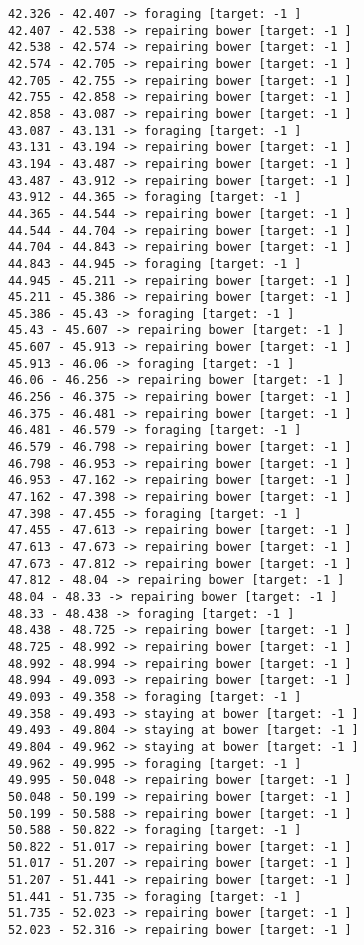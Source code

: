 \documentclass[11pt]{article}
\begin{document}
\begin{Verbatim}[commandchars=\\\{\}]
42.326 - 42.407 -> foraging [target: -1 ]
42.407 - 42.538 -> repairing bower [target: -1 ]
42.538 - 42.574 -> repairing bower [target: -1 ]
42.574 - 42.705 -> repairing bower [target: -1 ]
42.705 - 42.755 -> repairing bower [target: -1 ]
42.755 - 42.858 -> repairing bower [target: -1 ]
42.858 - 43.087 -> repairing bower [target: -1 ]
43.087 - 43.131 -> foraging [target: -1 ]
43.131 - 43.194 -> repairing bower [target: -1 ]
43.194 - 43.487 -> repairing bower [target: -1 ]
43.487 - 43.912 -> repairing bower [target: -1 ]
43.912 - 44.365 -> foraging [target: -1 ]
44.365 - 44.544 -> repairing bower [target: -1 ]
44.544 - 44.704 -> repairing bower [target: -1 ]
44.704 - 44.843 -> repairing bower [target: -1 ]
44.843 - 44.945 -> foraging [target: -1 ]
44.945 - 45.211 -> repairing bower [target: -1 ]
45.211 - 45.386 -> repairing bower [target: -1 ]
45.386 - 45.43 -> foraging [target: -1 ]
45.43 - 45.607 -> repairing bower [target: -1 ]
45.607 - 45.913 -> repairing bower [target: -1 ]
45.913 - 46.06 -> foraging [target: -1 ]
46.06 - 46.256 -> repairing bower [target: -1 ]
46.256 - 46.375 -> repairing bower [target: -1 ]
46.375 - 46.481 -> repairing bower [target: -1 ]
46.481 - 46.579 -> foraging [target: -1 ]
46.579 - 46.798 -> repairing bower [target: -1 ]
46.798 - 46.953 -> repairing bower [target: -1 ]
46.953 - 47.162 -> repairing bower [target: -1 ]
47.162 - 47.398 -> repairing bower [target: -1 ]
47.398 - 47.455 -> foraging [target: -1 ]
47.455 - 47.613 -> repairing bower [target: -1 ]
47.613 - 47.673 -> repairing bower [target: -1 ]
47.673 - 47.812 -> repairing bower [target: -1 ]
47.812 - 48.04 -> repairing bower [target: -1 ]
48.04 - 48.33 -> repairing bower [target: -1 ]
48.33 - 48.438 -> foraging [target: -1 ]
48.438 - 48.725 -> repairing bower [target: -1 ]
48.725 - 48.992 -> repairing bower [target: -1 ]
48.992 - 48.994 -> repairing bower [target: -1 ]
48.994 - 49.093 -> repairing bower [target: -1 ]
49.093 - 49.358 -> foraging [target: -1 ]
49.358 - 49.493 -> staying at bower [target: -1 ]
49.493 - 49.804 -> staying at bower [target: -1 ]
49.804 - 49.962 -> staying at bower [target: -1 ]
49.962 - 49.995 -> foraging [target: -1 ]
49.995 - 50.048 -> repairing bower [target: -1 ]
50.048 - 50.199 -> repairing bower [target: -1 ]
50.199 - 50.588 -> repairing bower [target: -1 ]
50.588 - 50.822 -> foraging [target: -1 ]
50.822 - 51.017 -> repairing bower [target: -1 ]
51.017 - 51.207 -> repairing bower [target: -1 ]
51.207 - 51.441 -> repairing bower [target: -1 ]
51.441 - 51.735 -> foraging [target: -1 ]
51.735 - 52.023 -> repairing bower [target: -1 ]
52.023 - 52.316 -> repairing bower [target: -1 ]

\end{Verbatim}
\end{document}
